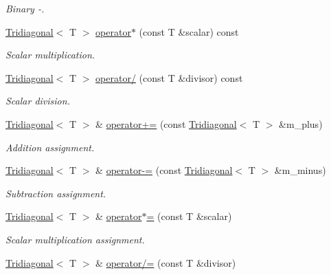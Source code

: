 \begin{DoxyCompactItemize}
\begin{DoxyCompactList}\small\item\em Binary -\/. \end{DoxyCompactList}\item 
\hyperlink{classLuna_1_1Tridiagonal}{Tridiagonal}$<$ T $>$ \hyperlink{classLuna_1_1Tridiagonal_a5dfe657389e0cb8af507ea77a8fda4e1}{operator$\ast$} (const T \&scalar) const
\begin{DoxyCompactList}\small\item\em Scalar multiplication. \end{DoxyCompactList}\item 
\hyperlink{classLuna_1_1Tridiagonal}{Tridiagonal}$<$ T $>$ \hyperlink{classLuna_1_1Tridiagonal_a3994e79c15f9848a1c1badb19247c1c7}{operator/} (const T \&divisor) const
\begin{DoxyCompactList}\small\item\em Scalar division. \end{DoxyCompactList}\item 
\hyperlink{classLuna_1_1Tridiagonal}{Tridiagonal}$<$ T $>$ \& \hyperlink{classLuna_1_1Tridiagonal_a5f34fd29d4ba9f517897a4c9eafa8157}{operator+=} (const \hyperlink{classLuna_1_1Tridiagonal}{Tridiagonal}$<$ T $>$ \&m\+\_\+plus)
\begin{DoxyCompactList}\small\item\em Addition assignment. \end{DoxyCompactList}\item 
\hyperlink{classLuna_1_1Tridiagonal}{Tridiagonal}$<$ T $>$ \& \hyperlink{classLuna_1_1Tridiagonal_ae4371d0bd7267737984ab697968f9eac}{operator-\/=} (const \hyperlink{classLuna_1_1Tridiagonal}{Tridiagonal}$<$ T $>$ \&m\+\_\+minus)
\begin{DoxyCompactList}\small\item\em Subtraction assignment. \end{DoxyCompactList}\item 
\hyperlink{classLuna_1_1Tridiagonal}{Tridiagonal}$<$ T $>$ \& \hyperlink{classLuna_1_1Tridiagonal_ad2050805abc012920f7c29cbf93989c3}{operator$\ast$=} (const T \&scalar)
\begin{DoxyCompactList}\small\item\em Scalar multiplication assignment. \end{DoxyCompactList}\item 
\hyperlink{classLuna_1_1Tridiagonal}{Tridiagonal}$<$ T $>$ \& \hyperlink{classLuna_1_1Tridiagonal_a0508de0c1797db737adaff1a6ee63763}{operator/=} (const T \&divisor)

\end{DoxyCompactItemize}

